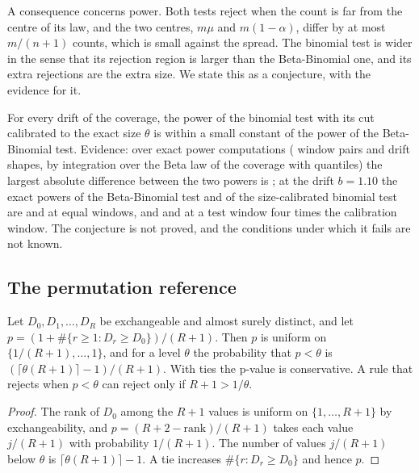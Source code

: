 A consequence concerns power. Both tests reject when the count is far from the centre of its law, and the two centres, $m\mu$ and $m(1-\alpha)$, differ by at most $m/(n+1)$ counts, which is small against the spread. The binomial test is wider in the sense that its rejection region is larger than the Beta-Binomial one, and its extra rejections are the extra size. We state this as a conjecture, with the evidence for it.

\begin{remark}
\label{conj:power}
For every drift of the coverage, the power of the binomial test with its cut calibrated to the exact size $\theta$ is within a small constant of the power of the Beta-Binomial test. Evidence: over \ExPowGapCells{} exact power computations (\ExPowPairs{} window pairs and \ExPowShapes{} drift shapes, by integration over the Beta law of the coverage with \ExPowNodes{} quantiles) the largest absolute difference between the two powers is \ExPowGapMax{}; at the drift $b=1.10$ the exact powers of the Beta-Binomial test and of the size-calibrated binomial test are \ExPowBBBTen{} and \ExPowOracleBTen{} at equal windows, and \ExPowBBCTen{} and \ExPowOracleCTen{} at a test window four times the calibration window. The conjecture is not proved, and the conditions under which it fails are not known.
\end{remark}

\subsection{The permutation reference}

\begin{proposition}
\label{prop:permutation}
Let $D_0,D_1,\dots,D_R$ be exchangeable and almost surely distinct, and let $p=(1+\#\{r\ge1:D_r\ge D_0\})/(R+1)$. Then $p$ is uniform on $\{1/(R+1),\dots,1\}$, and for a level $\theta$ the probability that $p<\theta$ is $(\lceil\theta(R+1)\rceil-1)/(R+1)$. With ties the p-value is conservative. A rule that rejects when $p<\theta$ can reject only if $R+1>1/\theta$.
\end{proposition}
\begin{proof}
The rank of $D_0$ among the $R+1$ values is uniform on $\{1,\dots,R+1\}$ by exchangeability, and $p=(R+2-\text{rank})/(R+1)$ takes each value $j/(R+1)$ with probability $1/(R+1)$. The number of values $j/(R+1)$ below $\theta$ is $\lceil\theta(R+1)\rceil-1$. A tie increases $\#\{r:D_r\ge D_0\}$ and hence $p$.
\end{proof}

